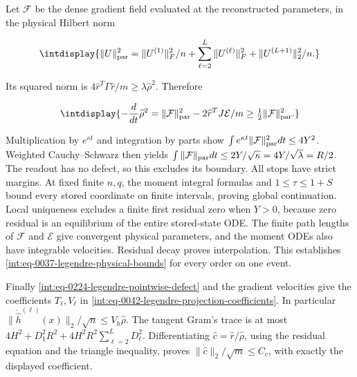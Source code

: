
Let \(\mathcal F\) be the dense gradient field evaluated at the reconstructed parameters, in the physical Hilbert norm


\begingroup\renewcommand{\theHequation}{intdisplay.526}
\begin{equation*}
\intdisplay{
\|U\|_{\rm par}^2=
\|U^{(1)}\|_F^2/n+
\sum_{\ell=2}^L\|U^{(\ell)}\|_F^2+
\|U^{(L+1)}\|_2^2/n.
}
\end{equation*}
\endgroup


Its squared norm is \(4\widehat r^T\Gamma\widehat r/m \ge\lambda\widehat\rho^2\). Therefore


\begingroup\renewcommand{\theHequation}{intdisplay.527}
\begin{equation*}
\intdisplay{
-\frac d{dt}\widehat\rho^2
=\|\mathcal F\|_{\rm par}^2
-2\widehat r^TJ\mathcal E/m
\ge\tfrac12\|\mathcal F\|_{\rm par}^2.
}
\end{equation*}
\endgroup


Multiplication by \(e^{\kappa t}\) and integration by parts show \(\int e^{\kappa t}\|\mathcal F\|_{\rm par}^2dt\le4Y^2\). Weighted Cauchy--Schwarz then yields \(\int\|\mathcal F\|_{\rm par}dt\le2Y/\sqrt\kappa =4Y/\sqrt\lambda=R/2\). The readout has no defect, so this excludes its boundary. All stops have strict margins. At fixed finite \(n,\allowbreak q\), the moment integral formulas and \(1\le\tau\le1+S\) bound every stored coordinate on finite intervals, proving global continuation. Local uniqueness excludes a finite first residual zero when \(Y>0\), because zero residual is an equilibrium of the entire stored-state ODE. The finite path lengths of \(\mathcal F\) and \(\mathcal E\) give convergent physical parameters, and the moment ODEs also have integrable velocities. Residual decay proves interpolation. This establishes \eqref{int:eq-0037-legendre-physical-bounds} for every order on one event.



Finally \eqref{int:eq-0224-legendre-pointwise-defect} and the gradient velocities give the coefficients \(T_\ell,\allowbreak V_\ell\) in \eqref{int:eq-0042-legendre-projection-coefficients}. In particular \(\|\dot{\widehat h}^{(\ell)}(x)\|_2/\sqrt n \le V_h\widehat\rho\). The tangent Gram's trace is at most \(4H^2+D_1^2R^2+4H^2R^2\sum_{\ell=2}^LD_\ell^2\). Differentiating \(\widehat c=\widehat r/\widehat\rho\), using the residual equation and the triangle inequality, proves \(\|\dot{\widehat c}\|_2/\sqrt m\le C_c\), with exactly the displayed coefficient.


